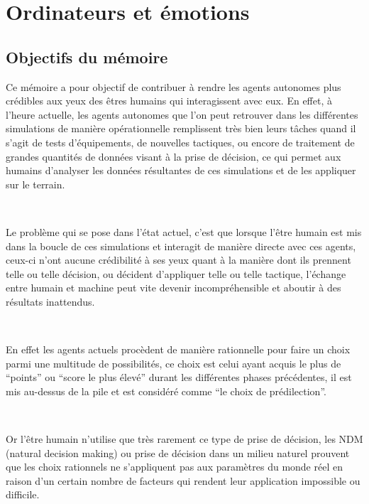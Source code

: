 
\chapter{Ordinateurs et émotions} %

\label{Chapter2} %


\section{Objectifs du mémoire}

Ce mémoire a pour objectif de contribuer à rendre les agents autonomes plus crédibles aux yeux des êtres humains qui interagissent avec eux. En effet, à l’heure actuelle, les agents autonomes que l’on peut retrouver dans les différentes simulations de manière opérationnelle remplissent très bien leurs tâches quand il s’agit de tests d’équipements, de nouvelles tactiques, ou encore de traitement de grandes quantités de données visant à la prise de décision,  ce qui permet aux humains d’analyser les données résultantes de ces simulations et de les appliquer sur le terrain.

~\par
Le problème qui se pose dans l’état actuel, c’est que lorsque l'être humain est mis dans la boucle de ces simulations et interagit de manière directe avec ces agents, ceux-ci n’ont aucune crédibilité à ses yeux quant à la manière dont ils prennent telle ou telle décision, ou décident d’appliquer telle ou telle tactique, l’échange entre humain et machine peut vite devenir incompréhensible et aboutir à des résultats inattendus.

~\par
En effet les agents actuels procèdent de manière rationnelle pour faire un choix parmi une multitude de possibilités, ce choix est celui ayant acquis le plus de “points” ou “score le plus élevé” durant les différentes phases précédentes, il est mis au-dessus de la pile et est considéré comme “le choix de prédilection”. 

~\par
Or l'être humain n’utilise que très rarement ce type de prise de décision, les NDM (natural decision making) ou prise de décision dans un milieu naturel prouvent que les choix rationnels ne s'appliquent pas aux paramètres du monde réel en raison d'un certain nombre de facteurs qui rendent leur application impossible ou difficile. 



